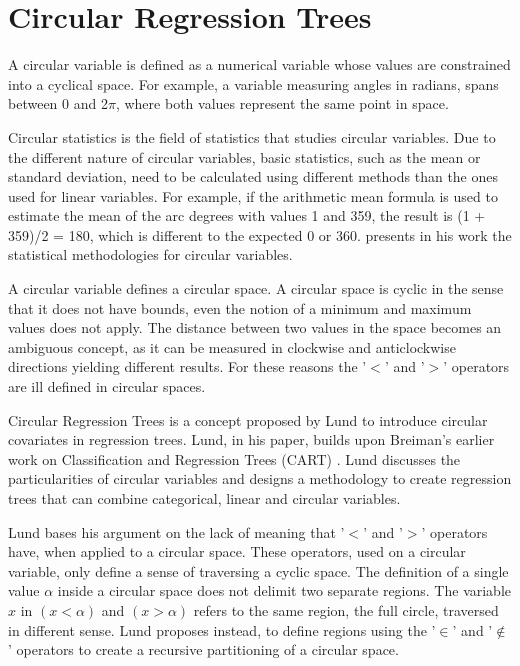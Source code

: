 \documentclass[times,twocolumn,final,authoryear]{elsarticle}
\begin{document}
\section{Circular Regression Trees}

A circular variable is defined as a numerical variable whose values are constrained into a cyclical space. For example, a variable measuring angles in radians, spans between 0 and 2$ \pi $, where both values represent the same point in space. 

Circular statistics is the field of statistics that studies circular variables. Due to the different nature of circular variables, basic statistics, such as the mean or standard deviation, need to be calculated using different methods than the ones used for linear variables. For example, if the arithmetic mean formula is used to estimate the mean of the arc degrees with values 1 and 359, the result is (1 + 359)/2 = 180, which is different to the expected 0 or 360. \citep{Fisher1992} presents in his work the statistical methodologies for circular variables.

A circular variable defines a circular space. A circular space is cyclic in the sense that it does not have bounds, even the notion of a minimum and maximum values does not apply. The distance between two values in the space becomes an ambiguous concept, as it can be measured in clockwise and anticlockwise directions yielding different results. For these reasons the '$<$' and '$>$' operators are ill defined in circular spaces.

Circular Regression Trees is a concept proposed by Lund \citep{Lund2002} to introduce circular covariates in regression trees. Lund, in his paper, builds upon Breiman's earlier work on Classification and Regression Trees (CART) \citep{Breimanetal1984}. Lund discusses the particularities of circular variables and designs a methodology to create regression trees that can combine categorical, linear and circular variables.

Lund bases his argument on the lack of meaning that '$<$' and '$>$' operators have, when applied to a circular space. These operators, used on a circular variable, only define a sense of traversing a cyclic space. The definition of a single value $\alpha$ inside a circular space does not delimit two separate regions. The variable $x$ in $(x < \alpha)$ and $(x > \alpha)$ refers to the same region, the full circle, traversed in different sense. Lund proposes instead, to define regions using the '$\in$' and '$\notin$' operators to create a recursive partitioning of a circular space. 
\end{document}
